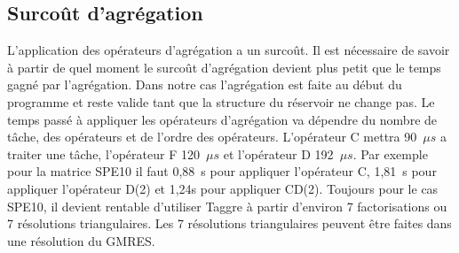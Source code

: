 \subsection{Surcoût d'agrégation}
L'application des opérateurs d'agrégation a un surcoût.
%
Il est nécessaire de savoir à partir de quel moment le surcoût d'agrégation devient plus petit que le temps gagné par l'agrégation.
%
Dans notre cas l'agrégation est faite au début du programme et reste valide tant que la structure du réservoir ne change pas.
%
Le temps passé à appliquer les opérateurs d'agrégation va dépendre du nombre de tâche, des opérateurs et de l'ordre des opérateurs.
%
L'opérateur C mettra 90~$\mu{s}$ a traiter une tâche, l'opérateur F 120~$\mu{s}$ et l'opérateur D 192~$\mu{s}$.
%
Par exemple pour la matrice SPE10 il faut 0,88~s pour appliquer l'opérateur C, 1,81~s pour appliquer l'opérateur D(2) et 1,24s pour appliquer CD(2).
%
Toujours pour le cas SPE10, il devient rentable d'utiliser Taggre à partir d'environ 7 factorisations ou 7 résolutions triangulaires.
%
Les 7 résolutions triangulaires peuvent être faites dans une résolution du GMRES.
